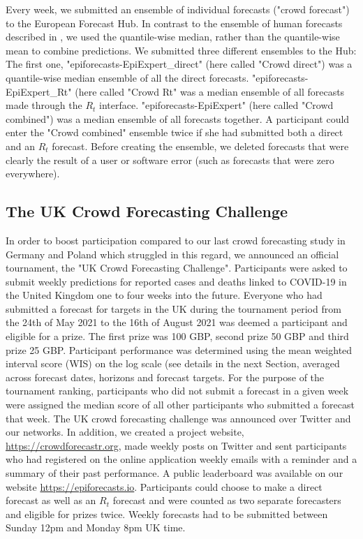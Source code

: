 \documentclass[10pt,a4paper,twocolumn]{article}
\begin{document}
Every week, we submitted an ensemble of individual forecasts ("crowd forecast") to the European Forecast Hub. In contrast to the ensemble of human forecasts described in \citet{bosseComparingHumanModelbased2022}, we used the quantile-wise median, rather than the quantile-wise mean to combine predictions. %
We submitted three different ensembles to the Hub: The first one, "epiforecasts-EpiExpert\_direct" (here called "Crowd direct") was a quantile-wise median ensemble of all the direct forecasts. "epiforecasts-EpiExpert\_Rt" (here called "Crowd Rt" was a median ensemble of all forecasts made through the $R_t$ interface. "epiforecasts-EpiExpert" (here called "Crowd combined") was a median ensemble of all forecasts together. A participant could enter the "Crowd combined" ensemble twice if she had submitted both a direct and an $R_t$ forecast. Before creating the ensemble, we deleted forecasts that were clearly the result of a user or software error (such as forecasts that were zero everywhere).

\subsection*{The UK Crowd Forecasting Challenge}

In order to boost participation compared to our last crowd forecasting study in Germany and Poland \citep{bosseComparingHumanModelbased2022} which struggled in this regard, we announced an official tournament, the "UK Crowd Forecasting Challenge". Participants were asked to submit weekly predictions for reported cases and deaths linked to COVID-19 in the United Kingdom one to four weeks into the future. Everyone who had submitted a forecast for targets in the UK during the tournament period from the 24th of May 2021 to the 16th of August 2021 was deemed a participant and eligible for a prize. The first prize was 100 GBP, second prize 50 GBP and third prize 25 GBP. Participant performance was determined using the mean weighted interval score (WIS) on the log scale (see details in the next Section, %
averaged across forecast dates, horizons and forecast targets. For the purpose of the tournament ranking, participants who did not submit a forecast in a given week were assigned the median score of all other participants who submitted a forecast that week. The UK crowd forecasting challenge was announced over Twitter and our networks. 
In addition, we created a project website, \url{https://crowdforecastr.org}, made weekly posts on Twitter and sent participants who had registered on the online application weekly emails with a reminder and a summary of their past performance. A public leaderboard was available on our website \url{https://epiforecasts.io}. Participants could choose to make a direct forecast as well as an $R_t$ forecast and were counted as two separate forecasters and eligible for prizes twice. Weekly forecasts had to be submitted between Sunday 12pm and Monday 8pm UK time. 
\end{document}
